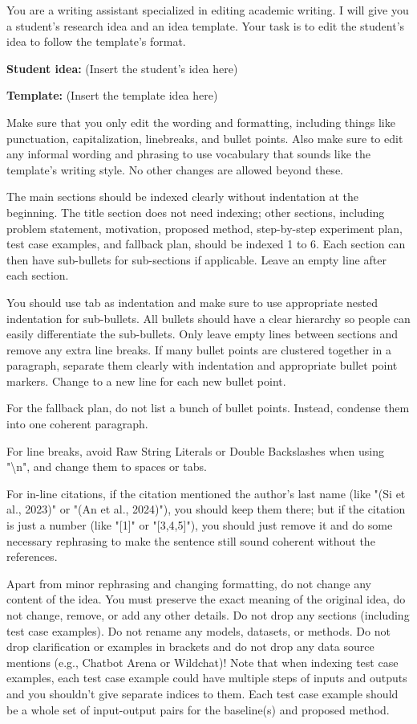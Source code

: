 \begin{tcolorbox}[colframe=green!50!black, colback=green!10!white, title=Style Standardization Prompt]
\small 
You are a writing assistant specialized in editing academic writing. I will give you a student's research idea and an idea template. Your task is to edit the student's idea to follow the template's format.

\textbf{Student idea:} (Insert the student's idea here)

\textbf{Template:} (Insert the template idea here)

Make sure that you only edit the wording and formatting, including things like punctuation, capitalization, linebreaks, and bullet points. Also make sure to edit any informal wording and phrasing to use vocabulary that sounds like the template's writing style. No other changes are allowed beyond these.

The main sections should be indexed clearly without indentation at the beginning. The title section does not need indexing; other sections, including problem statement, motivation, proposed method, step-by-step experiment plan, test case examples, and fallback plan, should be indexed 1 to 6. Each section can then have sub-bullets for sub-sections if applicable. Leave an empty line after each section.

You should use tab as indentation and make sure to use appropriate nested indentation for sub-bullets. All bullets should have a clear hierarchy so people can easily differentiate the sub-bullets. Only leave empty lines between sections and remove any extra line breaks. If many bullet points are clustered together in a paragraph, separate them clearly with indentation and appropriate bullet point markers. Change to a new line for each new bullet point.

For the fallback plan, do not list a bunch of bullet points. Instead, condense them into one coherent paragraph.

For line breaks, avoid Raw String Literals or Double Backslashes when using "\textbackslash n", and change them to spaces or tabs.

For in-line citations, if the citation mentioned the author's last name (like "(Si et al., 2023)" or "(An et al., 2024)"), you should keep them there; but if the citation is just a number (like "[1]" or "[3,4,5]"), you should just remove it and do some necessary rephrasing to make the sentence still sound coherent without the references.

Apart from minor rephrasing and changing formatting, do not change any content of the idea. You must preserve the exact meaning of the original idea, do not change, remove, or add any other details. Do not drop any sections (including test case examples). Do not rename any models, datasets, or methods. Do not drop clarification or examples in brackets and do not drop any data source mentions (e.g., Chatbot Arena or Wildchat)! Note that when indexing test case examples, each test case example could have multiple steps of inputs and outputs and you shouldn't give separate indices to them. Each test case example should be a whole set of input-output pairs for the baseline(s) and proposed method.


\end{tcolorbox}
